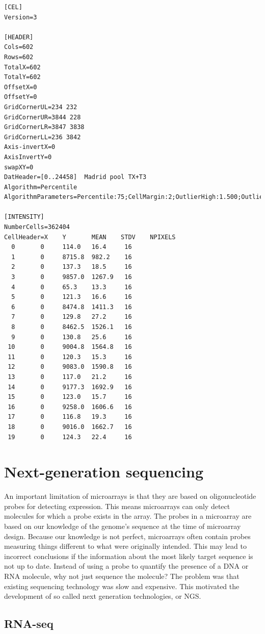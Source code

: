 \documentclass[]{book}
\theoremstyle{definition}
\theoremstyle{definition}
\theoremstyle{definition}
\theoremstyle{remark}
\begin{document}
\begin{verbatim}
[CEL]
Version=3

[HEADER]
Cols=602
Rows=602
TotalX=602
TotalY=602
OffsetX=0
OffsetY=0
GridCornerUL=234 232
GridCornerUR=3844 228
GridCornerLR=3847 3838
GridCornerLL=236 3842
Axis-invertX=0
AxisInvertY=0
swapXY=0
DatHeader=[0..24458]  Madrid pool TX+T3
Algorithm=Percentile
AlgorithmParameters=Percentile:75;CellMargin:2;OutlierHigh:1.500;OutlierLow:1.004

[INTENSITY]
NumberCells=362404
CellHeader=X    Y       MEAN    STDV    NPIXELS
  0       0     114.0   16.4     16
  1       0     8715.8  982.2    16
  2       0     137.3   18.5     16
  3       0     9857.0  1267.9   16
  4       0     65.3    13.3     16
  5       0     121.3   16.6     16
  6       0     8474.8  1411.3   16
  7       0     129.8   27.2     16
  8       0     8462.5  1526.1   16
  9       0     130.8   25.6     16
 10       0     9004.8  1564.8   16
 11       0     120.3   15.3     16
 12       0     9083.0  1590.8   16
 13       0     117.0   21.2     16
 14       0     9177.3  1692.9   16
 15       0     123.0   15.7     16
 16       0     9258.0  1606.6   16
 17       0     116.8   19.3     16
 18       0     9016.0  1662.7   16
 19       0     124.3   22.4     16
\end{verbatim}

\section{Next-generation sequencing}\label{next-generation-sequencing}

An important limitation of microarrays is that they are based on
oligonucleotide probes for detecting expression. This means microarrays
can only detect molecules for which a probe exists in the array. The
probes in a microarray are based on our knowledge of the genome's
sequence at the time of microarray design. Because our knowledge is not
perfect, microarrays often contain probes measuring things different to
what were originally intended. This may lead to incorrect conclusions if
the information about the most likely target sequence is not up to date.
Instead of using a probe to quantify the presence of a DNA or RNA
molecule, why not just sequence the molecule? The problem was that
existing sequencing technology was slow and expensive. This motivated
the development of so called next generation technologies, or NGS.

\subsection{RNA-seq}\label{rna-seq}
\end{document}
